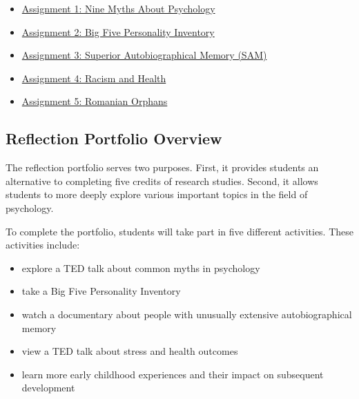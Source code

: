 \documentclass[
]{article}
\providecommand{\tightlist}{%
  \setlength{\itemsep}{0pt}\setlength{\parskip}{0pt}}
\begin{document}
\begin{itemize}
  \begin{itemize}
  \tightlist
  \item
    \protect\hyperlink{assignment-1-nine-myths-about-psychology}{Assignment 1: Nine Myths About Psychology}\\
  \item
    \protect\hyperlink{assignment-2-big-five-personality-inventory}{Assignment 2: Big Five Personality Inventory}\\
  \item
    \protect\hyperlink{assignment-3-superior-autobiographical-memory-sam}{Assignment 3: Superior Autobiographical Memory (SAM)}\\
  \item
    \protect\hyperlink{assignment-4-racism-and-health}{Assignment 4: Racism and Health}\\
  \item
    \protect\hyperlink{assignment-5-romanian-orphans}{Assignment 5: Romanian Orphans}
  \end{itemize}
\end{itemize}

\hypertarget{reflection-portfolio-overview}{%
\subsection{Reflection Portfolio Overview}\label{reflection-portfolio-overview}}

The reflection portfolio serves two purposes. First, it provides students an alternative to completing five credits of research studies. Second, it allows students to more deeply explore various important topics in the field of psychology.

To complete the portfolio, students will take part in five different activities. These activities include:

\begin{itemize}
\tightlist
\item
  explore a TED talk about common myths in psychology
\item
  take a Big Five Personality Inventory
\item
  watch a documentary about people with unusually extensive autobiographical memory
\item
  view a TED talk about stress and health outcomes
\item
  learn more early childhood experiences and their impact on subsequent development
\end{itemize}
\end{document}
